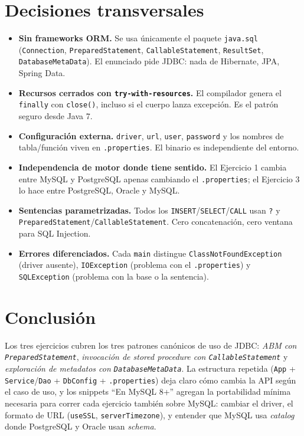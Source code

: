 \documentclass[11pt,a4paper]{article}
\begin{document}
\section{Decisiones transversales}

\begin{itemize}
    \item \textbf{Sin frameworks ORM.} Se usa únicamente el paquete \texttt{java.sql} (\texttt{Connection}, \texttt{PreparedStatement}, \texttt{CallableStatement}, \texttt{ResultSet}, \texttt{DatabaseMetaData}). El enunciado pide JDBC: nada de Hibernate, JPA, Spring Data.
    \item \textbf{Recursos cerrados con \texttt{try-with-resources}.} El compilador genera el \texttt{finally} con \texttt{close()}, incluso si el cuerpo lanza excepción. Es el patrón seguro desde Java 7.
    \item \textbf{Configuración externa.} \texttt{driver}, \texttt{url}, \texttt{user}, \texttt{password} y los nombres de tabla/función viven en \texttt{.properties}. El binario es independiente del entorno.
    \item \textbf{Independencia de motor donde tiene sentido.} El Ejercicio 1 cambia entre MySQL y PostgreSQL apenas cambiando el \texttt{.properties}; el Ejercicio 3 lo hace entre PostgreSQL, Oracle y MySQL.
    \item \textbf{Sentencias parametrizadas.} Todos los \texttt{INSERT}/\texttt{SELECT}/\texttt{CALL} usan \texttt{?} y \texttt{PreparedStatement}/\texttt{CallableStatement}. Cero concatenación, cero ventana para SQL Injection.
    \item \textbf{Errores diferenciados.} Cada \texttt{main} distingue \texttt{ClassNotFoundException} (driver ausente), \texttt{IOException} (problema con el \texttt{.properties}) y \texttt{SQLException} (problema con la base o la sentencia).
\end{itemize}

\section*{Conclusión}

Los tres ejercicios cubren los tres patrones canónicos de uso de JDBC: \emph{ABM con \texttt{PreparedStatement}}, \emph{invocación de stored procedure con \texttt{CallableStatement}} y \emph{exploración de metadatos con \texttt{DatabaseMetaData}}. La estructura repetida (\texttt{App} + \texttt{Service}/\texttt{Dao} + \texttt{DbConfig} + \texttt{.properties}) deja claro cómo cambia la API según el caso de uso, y los snippets ``En MySQL 8+'' agregan la portabilidad mínima necesaria para correr cada ejercicio también sobre MySQL: cambiar el driver, el formato de URL (\texttt{useSSL}, \texttt{serverTimezone}), y entender que MySQL usa \emph{catalog} donde PostgreSQL y Oracle usan \emph{schema}.
\end{document}
